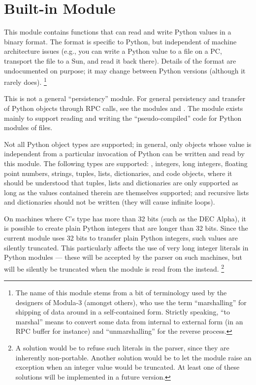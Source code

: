 \section{Built-in Module }
\label{module-marshal}

This module contains functions that can read and write Python
values in a binary format.  The format is specific to Python, but
independent of machine architecture issues (e.g., you can write a
Python value to a file on a PC, transport the file to a Sun, and read
it back there).  Details of the format are undocumented on purpose;
it may change between Python versions (although it rarely does).%
\footnote{The name of this module stems from a bit of terminology used
by the designers of Modula-3 (amongst others), who use the term
``marshalling'' for shipping of data around in a self-contained form.
Strictly speaking, ``to marshal'' means to convert some data from
internal to external form (in an RPC buffer for instance) and
``unmarshalling'' for the reverse process.}

This is not a general ``persistency'' module.  For general persistency
and transfer of Python objects through RPC calls, see the modules
 and .  The  module exists
mainly to support reading and writing the ``pseudo-compiled'' code for
Python modules of  files.

Not all Python object types are supported; in general, only objects
whose value is independent from a particular invocation of Python can
be written and read by this module.  The following types are supported:
, integers, long integers, floating point numbers,
strings, tuples, lists, dictionaries, and code objects, where it
should be understood that tuples, lists and dictionaries are only
supported as long as the values contained therein are themselves
supported; and recursive lists and dictionaries should not be written
(they will cause infinite loops).

 On machines where C's  type has more than
32 bits (such as the DEC Alpha), it
is possible to create plain Python integers that are longer than 32
bits.  Since the current  module uses 32 bits to
transfer plain Python integers, such values are silently truncated.
This particularly affects the use of very long integer literals in
Python modules --- these will be accepted by the parser on such
machines, but will be silently be truncated when the module is read
from the  instead.%
\footnote{A solution would be to refuse such literals in the parser,
since they are inherently non-portable.  Another solution would be to
let the  module raise an exception when an integer
value would be truncated.  At least one of these solutions will be
implemented in a future version.}

